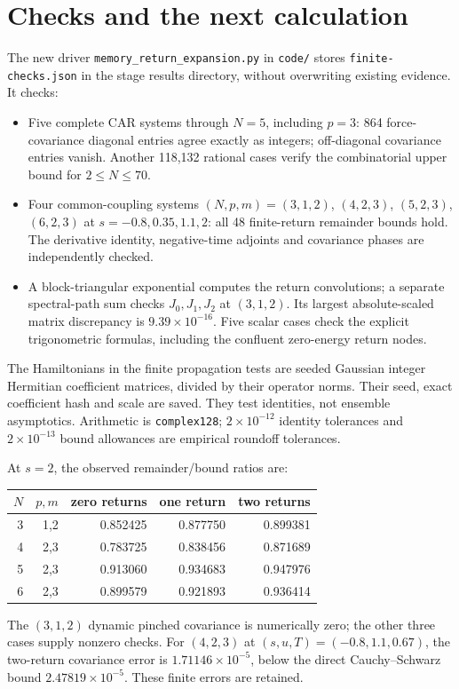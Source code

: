 \documentclass[11pt,a4paper]{article}
\begin{document}
\section{Checks and the next calculation}
The new driver \texttt{memory\_return\_expansion.py} in \texttt{code/}
stores \texttt{finite-checks.json} in the stage results directory,
without overwriting existing evidence. It checks:
\begin{itemize}
 \item Five complete CAR systems through $N=5$, including $p=3$:
 864 force-covariance diagonal entries agree exactly as integers;
 off-diagonal covariance entries vanish. Another 118,132 rational
 cases verify the combinatorial upper bound for $2\leq N\leq70$.
 \item Four common-coupling systems $(N,p,m)=(3,1,2)$, $(4,2,3)$,
 $(5,2,3)$, $(6,2,3)$ at $s=-0.8,0.35,1.1,2$:
 all 48 finite-return remainder bounds hold. The derivative identity,
 negative-time adjoints and covariance phases are independently checked.
 \item A block-triangular exponential computes the return convolutions;
 a separate spectral-path sum checks $J_0,J_1,J_2$ at $(3,1,2)$.
 Its largest absolute-scaled matrix discrepancy is $9.39\times10^{-16}$.
 Five scalar cases check the explicit trigonometric formulas, including
 the confluent zero-energy return nodes.
\end{itemize}
The Hamiltonians in the finite propagation tests are seeded Gaussian
integer Hermitian coefficient matrices, divided by their operator
norms. Their seed, exact coefficient hash and scale are saved.
They test identities, not ensemble asymptotics. Arithmetic is
\texttt{complex128}; $2\times10^{-12}$ identity tolerances and
$2\times10^{-13}$ bound allowances are empirical roundoff tolerances.

At $s=2$, the observed remainder/bound ratios are:
\begin{center}
\begin{tabular}{rrrrr}\toprule
$N$&$p,m$&zero returns&one return&two returns\\\midrule
3&1,2&0.852425&0.877750&0.899381\\
4&2,3&0.783725&0.838456&0.871689\\
5&2,3&0.913060&0.934683&0.947976\\
6&2,3&0.899579&0.921893&0.936414\\\bottomrule
\end{tabular}
\end{center}
The $(3,1,2)$ dynamic pinched covariance is numerically zero;
the other three cases supply nonzero checks. For $(4,2,3)$ at
$(s,u,T)=(-0.8,1.1,0.67)$, the two-return covariance error is
$1.71146\times10^{-5}$, below the direct Cauchy--Schwarz bound
$2.47819\times10^{-5}$. These finite errors are retained.
\end{document}
